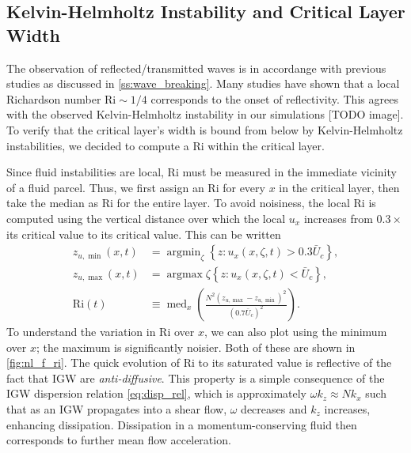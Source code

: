 \documentclass[
        fleqn,
        usenatbib,
    ]{mnras}
\newcommand*{\p}[1]{\left(#1\right)}
\newcommand*{\z}[1]{\left\{#1\right\}}
\DeclareMathOperator*{\argmin}{argmin}
\DeclareMathOperator*{\argmax}{argmax}
\DeclareMathOperator*{\med}{med}
\begin{document}
\subsection{Kelvin-Helmholtz Instability and Critical Layer Width}

The observation of reflected/transmitted waves is in accordange with previous
studies as discussed in \autoref{ss:wave_breaking}. Many studies have shown that
a local Richardson number $\mathrm{Ri} \sim 1/4$ corresponds to the onset of
reflectivity. This agrees with the observed Kelvin-Helmholtz instability in our
simulations [TODO image]. To verify that the critical layer's width is bound
from below by Kelvin-Helmholtz instabilities, we decided to compute a
$\mathrm{Ri}$ within the critical layer.

Since fluid instabilities are local, $\mathrm{Ri}$ must be measured in the
immediate vicinity of a fluid parcel. Thus, we first assign an $\mathrm{Ri}$ for
every $x$ in the critical layer, then take the median as $\mathrm{Ri}$ for the
entire layer. To avoid noisiness, the local $\mathrm{Ri}$ is computed using the
vertical distance over which the local $u_x$ increases from $0.3 \times$ its
critical value to its critical value. This can be written
\begin{align}
    z_{u, \min}(x, t) &= \argmin_\zeta
        \z{z: u_x(x, \zeta, t) > 0.3\bar{U}_c},\nonumber\\
    z_{u, \max}(x, t) &= \argmax
        \zeta \z{z: u_x(x, \zeta, t) < \bar{U}_c},\nonumber\\
    \mathrm{Ri}(t) &\equiv
        \med_x\p{\frac{N^2 \p{z_{u, \max} - z_{u, \min}}^2}{(0.7
            \bar{U}_c)^2}}.\label{ss:ri_med_def}
\end{align}
To understand the variation in $\mathrm{Ri}$ over $x$, we can also plot using
the minimum over $x$; the maximum is significantly noisier. Both of these are
shown in \autoref{fig:nl_f_ri}. The quick evolution of $\mathrm{Ri}$ to its
saturated value is reflective of the fact that IGW are \emph{anti-diffusive}.
This property is a simple consequence of the IGW dispersion relation
\autoref{eq:disp_rel}, which is approximately $\omega k_z \approx Nk_x$ such
that as an IGW propagates into a shear flow, $\omega$ decreases and $k_z$
increases, enhancing dissipation. Dissipation in a momentum-conserving fluid
then corresponds to further mean flow acceleration.
\end{document}
